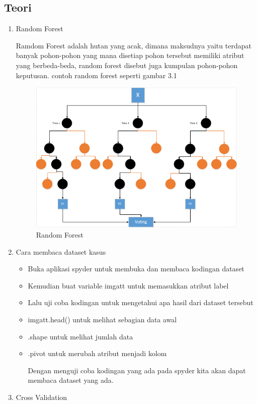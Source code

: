 \subsection {Teori}
\begin{enumerate}
\item Random Forest
\par
Ramdom Forest adalah hutan yang acak, dimana maksudnya yaitu terdapat banyak pohon-pohon yang mana disetiap pohon tersebut memiliki atribut yang berbeda-beda, random forest disebut juga kumpulan pohon-pohon keputusan. contoh random forest seperti gambar 3.1
\begin{figure}[ht]
\centering
\includegraphics[scale=0.6]{figures/RF/1_1.png}
\caption{Random Forest}
\end{figure}
\item Cara membaca dataset kasus
\begin{itemize}
\item Buka aplikasi spyder untuk membuka dan membaca kodingan dataset
\item Kemudian buat  variable imgatt untuk memasukkan atribut label
\item Lalu uji coba kodingan untuk mengetahui apa hasil dari dataset tersebut
\item imgatt.head() untuk melihat sebagian data awal
\item .shape untuk melihat jumlah data
\item .pivot untuk merubah atribut menjadi kolom
\par
Dengan menguji coba kodingan yang ada pada spyder kita akan dapat membaca dataset yang ada.
\end{itemize}
\item Cross Validation

\end{enumerate}
